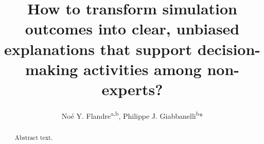 \documentclass[preprint,12pt]{elsarticle}
\begin{document}
\begin{frontmatter}



\title{How to transform simulation outcomes into clear, unbiased explanations that support decision-making activities among non-experts?
}





\author{Noé Y. Flandre\textsuperscript{a,b}, Philippe J. Giabbanelli\textsuperscript{b}*}



\begin{abstract}
Abstract text.
\end{abstract}

\begin{graphicalabstract}
\end{graphicalabstract}


\end{frontmatter}
\end{document}

